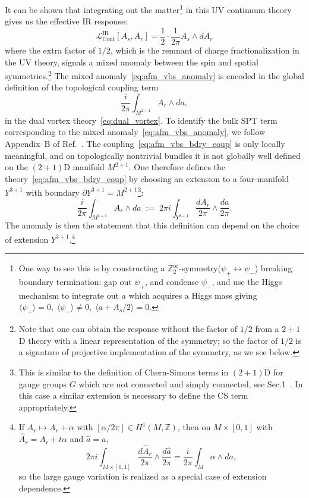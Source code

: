 \documentclass[aps,prx,reprint,superscriptaddress,twocolumn,amsmath,amssymb,amsfonts, nofootinbib]{revtex4-2}
\newcommand{\Z}{\mathbb{Z}}
\theoremstyle{apsstyle}
\begin{document}
It can be shown that integrating out the matter\footnote{One way to see this is by constructing a $\Z_{2}^{\mathrm{or}}$-symmetry($\psi_{+}\leftrightarrow\psi_{-}$) breaking boundary termination: gap out $\psi_{+}$, and condense $\psi_{-}$, and use the Higgs mechanism to integrate out $a$ which acquires a Higgs mass giving $\langle\psi_{+}\rangle=0,\; \langle\psi_{-}\rangle\neq 0,\; \langle a+A_{s}/2\rangle=0$.} in this UV continuum theory gives us the effective IR response:
\begin{equation}
    \mathcal{L}_{\mathrm{Cont}}^{\mathrm{IR}}[A_{s}, A_{r}] =\dfrac{1}{2}\cdot \dfrac{1}{2\pi} A_{s}\wedge dA_{r}
    \label{eq:afm_vbs_anomaly}
\end{equation}
where the extra factor of $1/2$, which is the remnant of charge fractionalization in the UV theory, signals a mixed anomaly between the spin and spatial symmetries.\footnote{Note that one can obtain the response without the factor of $1/2$ from a $2+1$D theory with a linear representation of the symmetry; so the factor of $1/2$ is a signature of projective implementation of the symmetry, as we see below.} 
The mixed anomaly~\eqref{eq:afm_vbs_anomaly} is encoded in the global definition of the topological coupling term
\begin{equation}
    \frac{i}{2\pi}\int_{M^{2+1}} A_r\wedge da,
    \label{eq:afm_vbs_bdry_coup}
\end{equation}
in the dual vortex theory~\eqref{eq:dual_vortex}.  To identify the bulk SPT term corresponding to the mixed anomaly~\eqref{eq:afm_vbs_anomaly}, we follow Appendix~B of Ref.~\cite{spatial_symm_3}. The coupling~\eqref{eq:afm_vbs_bdry_coup} is only locally meaningful, and on topologically nontrivial bundles it is not globally well defined on the $(2+1)$D manifold $M^{2+1}$. One therefore defines the theory~\eqref{eq:afm_vbs_bdry_coup} by choosing an extension to a four-manifold $Y^{3+1}$ with boundary $\partial Y^{3+1}=M^{2+1}$\footnote{This is similar to the definition of Chern-Simons terms in $(2+1)$D for gauge groups $G$ which are not connected and simply connected, see Sec.1~\cite{Dijkgraaf1990}. In this case a similar extension is necessary to define the CS term appropriately.}:
\begin{equation}
    \frac{i}{2\pi}\int_{M^{2+1}} A_r\wedge da
    \;:=\;
    2\pi i\int_{Y^{3+1}} \frac{dA_r}{2\pi}\wedge \frac{da}{2\pi}.
    \label{eq:bulk_ext}
\end{equation}
The anomaly is then the statement that this definition can depend on the choice of extension $Y^{3+1}$.\footnote{\label{fn:gauge}If $A_r\mapsto A_r+\alpha$ with $[\alpha/2\pi]\in H^1(M,\mathbb Z)$, then on $M\times[0,1]$ with $\widehat A_r=A_r+t\alpha$ and $\widehat a=a$,
\begin{equation*}
2\pi i\int_{M\times[0,1]} \frac{d\widehat A_r}{2\pi}\wedge \frac{d\widehat a}{2\pi}
= \frac{i}{2\pi}\int_M \alpha\wedge da,
\end{equation*}
so the large gauge variation is realized as a special case of extension dependence.}
\end{document}
